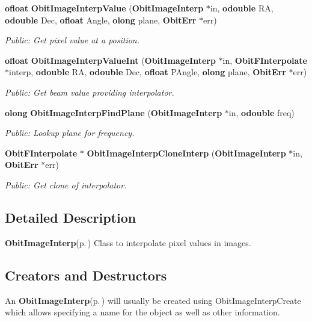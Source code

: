 \begin{CompactItemize}
{\bf ofloat} {\bf Obit\-Image\-Interp\-Value} ({\bf Obit\-Image\-Interp} $\ast$in, {\bf odouble} RA, {\bf odouble} Dec, {\bf ofloat} Angle, {\bf olong} plane, {\bf Obit\-Err} $\ast$err)
\begin{CompactList}\small\item\em Public: Get pixel value at a position. \item\end{CompactList}\item 
{\bf ofloat} {\bf Obit\-Image\-Interp\-Value\-Int} ({\bf Obit\-Image\-Interp} $\ast$in, {\bf Obit\-FInterpolate} $\ast$interp, {\bf odouble} RA, {\bf odouble} Dec, {\bf ofloat} PAngle, {\bf olong} plane, {\bf Obit\-Err} $\ast$err)
\begin{CompactList}\small\item\em Public: Get beam value providing interpolator. \item\end{CompactList}\item 
{\bf olong} {\bf Obit\-Image\-Interp\-Find\-Plane} ({\bf Obit\-Image\-Interp} $\ast$in, {\bf odouble} freq)
\begin{CompactList}\small\item\em Public: Lookup plane for frequency. \item\end{CompactList}\item 
{\bf Obit\-FInterpolate} $\ast$ {\bf Obit\-Image\-Interp\-Clone\-Interp} ({\bf Obit\-Image\-Interp} $\ast$in, {\bf Obit\-Err} $\ast$err)
\begin{CompactList}\small\item\em Public: Get clone of interpolator. \item\end{CompactList}\end{CompactItemize}


\subsection{Detailed Description}
{\bf Obit\-Image\-Interp}{\rm (p.\,\pageref{structObitImageInterp})} Class to interpolate pixel values in images. 

\subsection{Creators and Destructors}\label{ObitImageInterp_8h_ObitImageInterpaccess}
An {\bf Obit\-Image\-Interp}{\rm (p.\,\pageref{structObitImageInterp})} will usually be created using Obit\-Image\-Interp\-Create which allows specifying a name for the object as well as other information.

